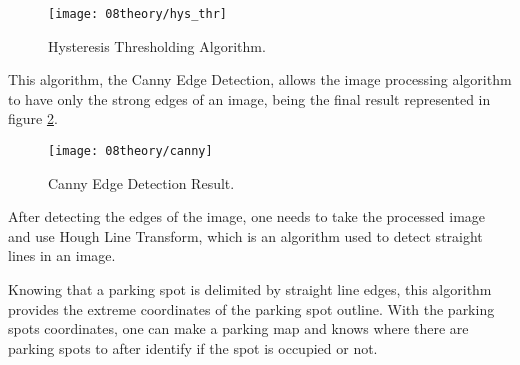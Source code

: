 \begin{figure}[H]
	\centering
	\texttt{[image: 08theory/hys\_thr]}
	\caption{Hysteresis Thresholding Algorithm.}
	\label{fig:hys_thr}
\end{figure}

This algorithm, the Canny Edge Detection, allows the image processing algorithm to have only the strong edges of an image, being the final result represented in figure \ref{fig:canny}.

\begin{figure}[H]
	\centering
	\texttt{[image: 08theory/canny]}
	\caption{Canny Edge Detection Result.}
	\label{fig:canny}
\end{figure}

\clearpage
{}

After detecting the edges of the image, one needs to take the processed image and use Hough Line Transform, which is an algorithm used to detect straight lines in an image. \cite{hough} 

Knowing that a parking spot is delimited by straight line edges, this algorithm provides the extreme coordinates of the parking spot outline. With the parking spots coordinates, one can make a parking map and knows where there are parking spots to after identify if the spot is occupied or not.



